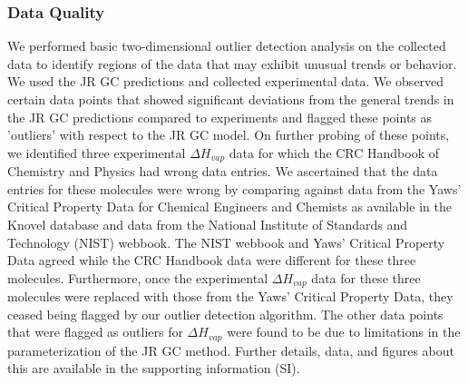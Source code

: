 \documentclass[journal=jacsat,manuscript=article]{achemso}
\begin{document}
\subsubsection{Data Quality}
We performed basic two-dimensional outlier detection analysis on the collected data to identify regions of the data that may exhibit unusual trends or behavior. We used the JR GC predictions and collected experimental data. We observed certain data points that showed significant deviations from the general trends in the JR GC predictions compared to experiments and flagged these points as 'outliers' with respect to the JR GC model. On further probing of these points, we identified three experimental $\Delta H_{vap}$ data for which the CRC Handbook of Chemistry and Physics had wrong data entries. We ascertained that the data entries for these molecules were wrong by comparing against data from the Yaws' Critical Property Data for Chemical Engineers and Chemists as available in the Knovel database and data from the National Institute of Standards and Technology (NIST) webbook. The NIST webbook and Yaws' Critical Property Data agreed while the CRC Handbook data were different for these three molecules. Furthermore, once the experimental $\Delta H_{vap}$ data for these three molecules were replaced with those from the Yaws' Critical Property Data, they ceased being flagged by our outlier detection algorithm. The other data points that were flagged as outliers for $\Delta H_{vap}$ were found to be due to limitations in the parameterization of the JR GC method. Further details, data, and figures about this are available in the supporting information (SI). 
\end{document}

